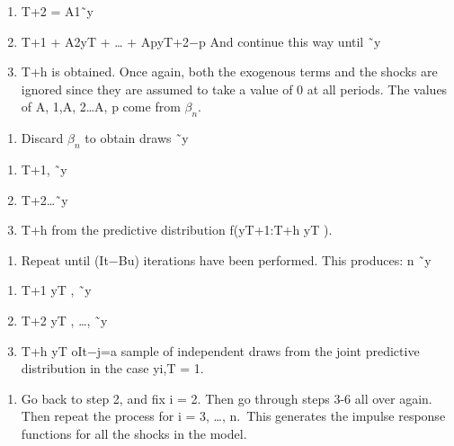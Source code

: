 \documentclass[
]{article}
\providecommand{\tightlist}{%
  \setlength{\itemsep}{0pt}\setlength{\parskip}{0pt}}
\begin{document}
\begin{enumerate}
\def\labelenumi{(\alph{enumi})}
\setcounter{enumi}{13}
\tightlist
\item
  T+2 = A1˜y
\item
  T+1 + A2yT + \ldots{} + ApyT+2−p
  And continue this way until ˜y
\item
  T+h is obtained. Once again, both the exogenous terms and the
  shocks are ignored since they are assumed to take a value of 0 at all periods. The values of
  A,
  1,A,
  2\ldots A,
  p come from \(\beta_{n}\).
\end{enumerate}

\begin{enumerate}
\def\labelenumi{\arabic{enumi}.}
\setcounter{enumi}{4}
\tightlist
\item
  Discard \(\beta_{n}\) to obtain draws ˜y
\end{enumerate}

\begin{enumerate}
\def\labelenumi{(\alph{enumi})}
\setcounter{enumi}{13}
\tightlist
\item
  T+1, ˜y
\item
  T+2\ldots˜y
\item
  T+h from the predictive distribution f(yT+1:T+h \textbar yT ).
\end{enumerate}

\begin{enumerate}
\def\labelenumi{\arabic{enumi}.}
\setcounter{enumi}{5}
\tightlist
\item
  Repeat until (It−Bu) iterations have been performed. This produces:
  n
  ˜y
\end{enumerate}

\begin{enumerate}
\def\labelenumi{(\alph{enumi})}
\setcounter{enumi}{13}
\tightlist
\item
  T+1 \textbar yT , ˜y
\item
  T+2 \textbar yT , \ldots, ˜y
\item
  T+h \textbar yT
  oIt−j=a sample of independent draws from the joint predictive distribution in the case yi,T = 1.
\end{enumerate}

\begin{enumerate}
\def\labelenumi{\arabic{enumi}.}
\setcounter{enumi}{6}
\tightlist
\item
  Go back to step 2, and fix i = 2. Then go through steps 3-6 all over again. Then repeat the process for i = 3, \ldots, n.~This generates the impulse response functions for all the shocks in the model.
\end{enumerate}
\end{document}
